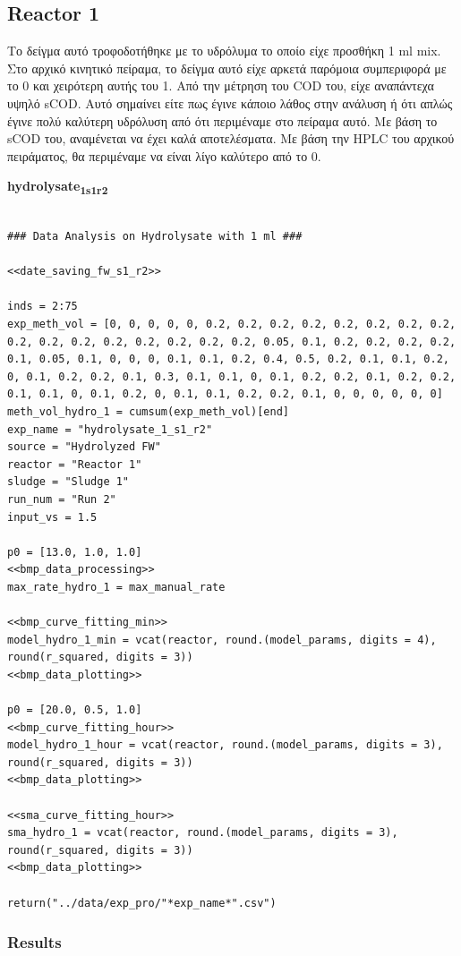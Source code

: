 \documentclass[11pt]{article}
\begin{document}
\subsection{Reactor 1}
\label{sec:orgc42c0a7}
Το δείγμα αυτό τροφοδοτήθηκε με το υδρόλυμα το οποίο είχε προσθήκη 1 ml mix. Στο αρχικό κινητικό πείραμα, το δείγμα αυτό είχε αρκετά παρόμοια συμπεριφορά με το 0 και χειρότερη αυτής του 1. Από την μέτρηση του COD του, είχε αναπάντεχα υψηλό sCOD. Αυτό σημαίνει είτε πως έγινε κάποιο λάθος στην ανάλυση ή ότι απλώς έγινε πολύ καλύτερη υδρόλυση από ότι περιμέναμε στο πείραμα αυτό. Με βάση το sCOD του, αναμένεται να έχει καλά αποτελέσματα. Με βάση την HPLC του αρχικού πειράματος, θα περιμέναμε να είναι λίγο καλύτερο από το 0.

\textbf{hydrolysate\textsubscript{1}\textsubscript{s1}\textsubscript{r2}}
\begin{verbatim}

### Data Analysis on Hydrolysate with 1 ml ###

<<date_saving_fw_s1_r2>>

inds = 2:75
exp_meth_vol = [0, 0, 0, 0, 0, 0.2, 0.2, 0.2, 0.2, 0.2, 0.2, 0.2, 0.2, 0.2, 0.2, 0.2, 0.2, 0.2, 0.2, 0.2, 0.2, 0.05, 0.1, 0.2, 0.2, 0.2, 0.2, 0.1, 0.05, 0.1, 0, 0, 0, 0.1, 0.1, 0.2, 0.4, 0.5, 0.2, 0.1, 0.1, 0.2, 0, 0.1, 0.2, 0.2, 0.1, 0.3, 0.1, 0.1, 0, 0.1, 0.2, 0.2, 0.1, 0.2, 0.2, 0.1, 0.1, 0, 0.1, 0.2, 0, 0.1, 0.1, 0.2, 0.2, 0.1, 0, 0, 0, 0, 0, 0]
meth_vol_hydro_1 = cumsum(exp_meth_vol)[end]
exp_name = "hydrolysate_1_s1_r2"
source = "Hydrolyzed FW"
reactor = "Reactor 1"
sludge = "Sludge 1"
run_num = "Run 2"
input_vs = 1.5

p0 = [13.0, 1.0, 1.0]
<<bmp_data_processing>>
max_rate_hydro_1 = max_manual_rate

<<bmp_curve_fitting_min>>
model_hydro_1_min = vcat(reactor, round.(model_params, digits = 4), round(r_squared, digits = 3))
<<bmp_data_plotting>>

p0 = [20.0, 0.5, 1.0]
<<bmp_curve_fitting_hour>>
model_hydro_1_hour = vcat(reactor, round.(model_params, digits = 3), round(r_squared, digits = 3))
<<bmp_data_plotting>>

<<sma_curve_fitting_hour>>
sma_hydro_1 = vcat(reactor, round.(model_params, digits = 3), round(r_squared, digits = 3))
<<bmp_data_plotting>>

return("../data/exp_pro/"*exp_name*".csv")
\end{verbatim}

\subsubsection{Results}
\label{sec:org83074f0}
\end{document}
